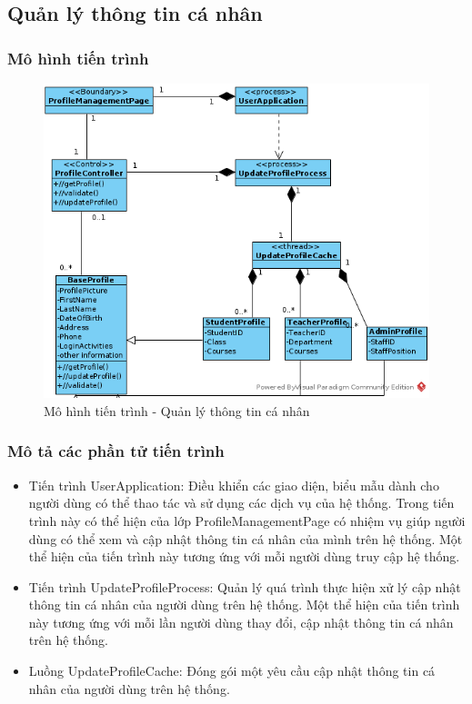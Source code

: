 \documentclass[./../main.tex]{subfiles}
\begin{document}
\subsection{Quản lý thông tin cá nhân}

\subsubsection{Mô hình tiến trình}

\begin{figure}[H]
	\centering
	\includegraphics[width=\linewidth]{./images/pv_ProfileManagement.png}
\caption{Mô hình tiến trình - Quản lý thông tin cá nhân}
\end{figure}

\subsubsection{Mô tả các phần tử tiến trình}
\begin{itemize}
	\item Tiến trình UserApplication: Điều khiển các giao diện, biểu mẫu dành cho người dùng có thể thao tác và sử dụng các dịch vụ của hệ thống. Trong tiến trình này có  thể hiện của lớp ProfileManagementPage có nhiệm vụ giúp người dùng có thể xem và cập nhật thông tin cá nhân của mình trên hệ thống.
	      Một thể hiện của tiến trình này tương ứng với mỗi người dùng truy cập hệ thống.
	\item Tiến trình UpdateProfileProcess: Quản lý quá trình thực hiện xử lý cập nhật thông tin cá nhân của người dùng trên hệ thống.
	      Một thể hiện của tiến trình này tương ứng với mỗi lần người dùng thay đổi, cập nhật thông tin cá nhân trên hệ thống.
	\item Luồng UpdateProfileCache: Đóng gói một yêu cầu cập nhật thông tin cá nhân của người dùng trên hệ thống.
\end{itemize}
\end{document}
